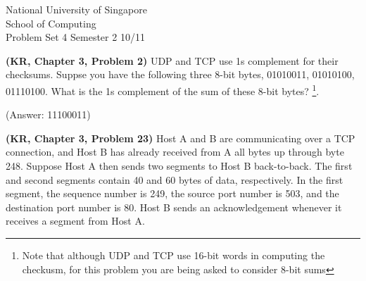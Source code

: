 \documentclass[a4paper,11pt]{exam}
\begin{document}
    \extraheadheight{.5in}
    {\large\sf National University of Singapore\\ School of Computing \\
    \LARGE\sf Problem Set 4}%
    {\large\sf Semester 2 10/11}
    \firstpageheadrule
    \pagestyle{headandfoot}

    \begin{questions}
\question 
\textbf{(KR, Chapter 3, Problem 2)} 
UDP and TCP use 1s complement for their checksums.  Suppse you have the following three 8-bit bytes, 01010011, 01010100, 01110100.  What is the 1s complement of the sum of these 8-bit bytes?  \footnote{Note that although UDP and TCP use 16-bit words in computing the checkusm, for this problem you are being asked to consider 8-bit sums}.  

(Answer: 11100011)

\question 
\textbf{(KR, Chapter 3, Problem 23)} 
Host A and B are communicating over a TCP connection, and Host B has already received from A all bytes up through byte 248.  Suppose Host A then sends two segments to Host B back-to-back.  The first and second segments contain 40 and 60 bytes of data, respectively.  In the first segment, the sequence number is 249, the source port number is 503, and the destination port number is 80.  Host B sends an acknowledgement whenever it receives a segment from Host A.

\end{questions}
\end{document}
